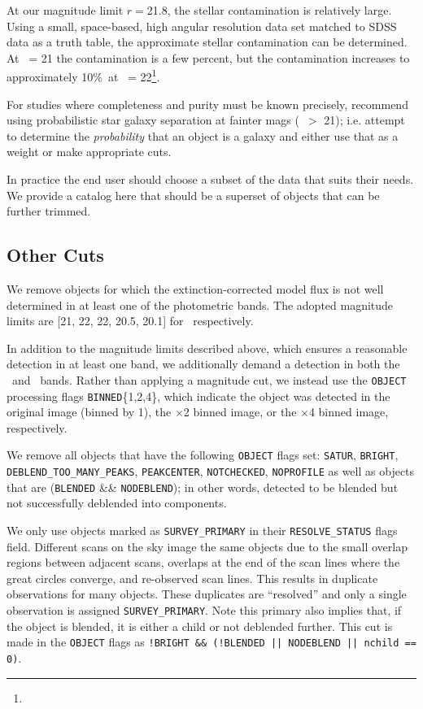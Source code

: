\documentclass[preprint]{aastex}
\newcommand{\rmax}{21.8}
\newcommand{\contamworst}{10\%}
\begin{document}
At our magnitude limit $r = $\rmax, the stellar contamination is relatively
large.  Using a small, space-based, high angular resolution data set matched to
SDSS data as a truth table, the approximate stellar contamination can be
determined.  At \rmag\ = 21 the contamination is a few percent, but the
contamination increases to approximately \contamworst\ at \rmag\ =
22\footnote{\DRsevsg}.  

For studies where completeness and purity must be known precisely,
\citet{ScrantonMag05} recommend using probabilistic star galaxy separation at
fainter mags (\rmag\ $ > $ 21); i.e.  attempt to determine the {\it
probability} that an object is a galaxy and either use that as a weight or make
appropriate cuts. 


In practice the end user should choose a subset of the data that suits their
needs.  We provide a catalog here that should be a superset of objects that can
be further trimmed.

\subsection{Other Cuts}

We remove objects for which the extinction-corrected \citep{Schlegel98} model
flux is not well determined in at least one of the photometric bands.  The
adopted magnitude limits are [21, 22, 22, 20.5, 20.1] for \allmag\
respectively.

In addition to the magnitude limits described above, which ensures a reasonable
detection in at least one band, we additionally demand a detection in both the
\rmag\ and \imag\ bands.  Rather than applying a magnitude cut, we instead use
the \texttt{OBJECT} processing flags \texttt{BINNED}\{1,2,4\}, which indicate
the object was detected in the original image (binned by 1), the $\times$2
binned image, or the $\times$4 binned image, respectively\citep{Stough02}.

We remove all objects that have the following \texttt{OBJECT} flags set:
\texttt{SATUR}, \texttt{BRIGHT}, \texttt{DEBLEND\_TOO\_MANY\_PEAKS},
\texttt{PEAKCENTER}, \texttt{NOTCHECKED}, \texttt{NOPROFILE} as well as objects
that are (\texttt{BLENDED} \&\& \texttt{NODEBLEND}); in other words, detected
to be blended but not successfully deblended into components. 

We only use objects marked as \texttt{SURVEY\_PRIMARY} in their
\texttt{RESOLVE\_STATUS} flags field. Different scans on the sky image the same
objects due to the small overlap regions between adjacent scans, overlaps at
the end of the scan lines where the great circles converge, and re-observed
scan lines.  This results in duplicate observations for many objects.  These
duplicates are ``resolved'' and only a single observation is assigned
\texttt{SURVEY\_PRIMARY}.  Note this primary also implies that, if the object
is blended, it is either a child or not deblended further.  This cut is made in
the \texttt{OBJECT} flags as \texttt{!BRIGHT \&\& (!BLENDED || NODEBLEND ||
nchild == 0)}.
\end{document}
